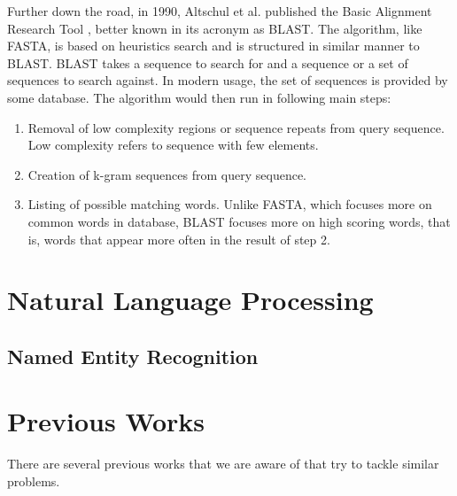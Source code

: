 Further down the road, in 1990, Altschul et al. published the Basic Alignment Research Tool \citep{Altschul90}, better known in its acronym as BLAST. The algorithm, like FASTA, is based on heuristics search and is structured in similar manner to BLAST. BLAST takes a sequence to search for and a sequence or a set of sequences to search against. In modern usage, the set of sequences is provided by some database. The algorithm would then run in following main steps\citep{mount2001bioinformatics}:

\begin{enumerate}
\item Removal of low complexity regions or sequence repeats from query sequence. Low complexity refers to sequence with few elements.
\item Creation of k-gram sequences from query sequence.
\item Listing of possible matching words. Unlike FASTA, which focuses more on common words in database, BLAST focuses more on high scoring words, that is, words that appear more often in the result of step 2.

\end{enumerate}



\section{Natural Language Processing}

\subsection{Named Entity Recognition}


\section{Previous Works}

There are several previous works that we are aware of that try to tackle similar problems. 